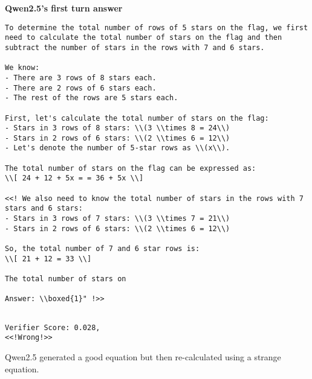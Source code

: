 \textbf{Qwen2.5's first turn answer} 
\begin{lstlisting}
To determine the total number of rows of 5 stars on the flag, we first need to calculate the total number of stars on the flag and then subtract the number of stars in the rows with 7 and 6 stars.

We know:
- There are 3 rows of 8 stars each.
- There are 2 rows of 6 stars each.
- The rest of the rows are 5 stars each.

First, let's calculate the total number of stars on the flag:
- Stars in 3 rows of 8 stars: \\(3 \\times 8 = 24\\)
- Stars in 2 rows of 6 stars: \\(2 \\times 6 = 12\\)
- Let's denote the number of 5-star rows as \\(x\\).

The total number of stars on the flag can be expressed as:
\\[ 24 + 12 + 5x = = 36 + 5x \\]

<<! We also need to know the total number of stars in the rows with 7 stars and 6 stars:
- Stars in 3 rows of 7 stars: \\(3 \\times 7 = 21\\)
- Stars in 2 rows of 6 stars: \\(2 \\times 6 = 12\\)

So, the total number of 7 and 6 star rows is:
\\[ 21 + 12 = 33 \\]

The total number of stars on

Answer: \\boxed{1}" !>>


\end{lstlisting}
\begin{lstlisting}
Verifier Score: 0.028,
<<!Wrong!>> 
\end{lstlisting}
Qwen2.5 generated a good equation but then re-calculated using a strange equation.

